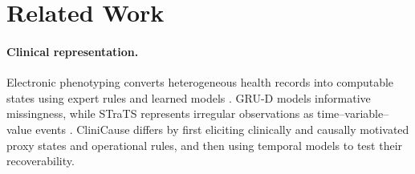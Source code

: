\documentclass[letterpaper]{article}
\begin{document}


\section{Related Work}

\paragraph{Clinical representation.}
Electronic phenotyping converts heterogeneous health records into computable
states using expert rules and learned models
\cite{banda_2018_electronic_phenotyping,ratner_et_al_2020_snorkel}.
GRU-D models informative missingness, while STraTS represents irregular
observations as time--variable--value events
\cite{che2018grud,tipirneni2022strats}. CliniCause differs by first eliciting
clinically and causally motivated proxy states and operational rules, and then
using temporal models to test their recoverability.
\end{document}
